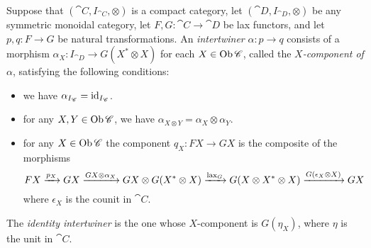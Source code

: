 \documentclass[12pt,oneside,article,draft]{memoir}
\begin{document}
\begin{definition}

Suppose that $(\cat{C},I_{\cat{C}},\otimes)$ is a compact category, let $(\cat{D},I_{\cat{D}},\otimes)$ be any symmetric monoidal category, let $F,G\colon\cat{C}\to\cat{D}$ be lax functors, and let $p,q\colon F\to G$ be natural transformations.
An \emph{intertwiner} $\alpha\colon p\to q$ consists of a morphism $\alpha_X\colon I_{\cat{D}}\to G(X^\ast\otimes X)$ for each $X\in\operatorname{Ob}\mathscr{C}$, called the \emph{$X$-component of $\alpha$}, satisfying the following conditions:
\begin{itemize}
	\item we have $\alpha_{I_{\mathscr{C}}}=\operatorname{id}_{I_{\mathscr{C}}}$.
	\item for any $X,Y\in\operatorname{Ob}\mathscr{C}$, we have $\alpha_{X\otimes Y}=\alpha_X\otimes\alpha_Y$.
	\item for any $X\in\operatorname{Ob}\mathscr{C}$ the component $q_X\colon FX\to GX$ is the composite of the morphisms
		$$FX\xrightarrow{p_X}GX\xrightarrow{GX\otimes\alpha_X}
		GX\otimes G(X^\ast\otimes X)\xrightarrow{\textnormal{lax}_G}
		G(X\otimes X^\ast\otimes X)\xrightarrow{G(\epsilon_X\otimes X)}
		GX
		$$
	where $\epsilon_X$ is the counit in $\cat{C}$.
\end{itemize}
The \emph{identity intertwiner} is the one whose $X$-component is $G(\eta_X)$, where $\eta$ is the unit in $\cat{C}$.

\end{definition}
\end{document}
